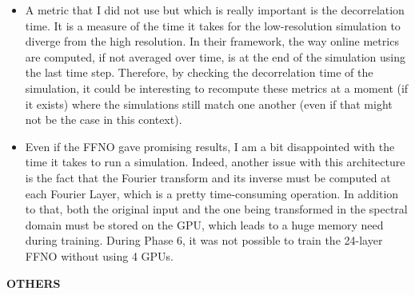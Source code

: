 \begin{itemize}
	\item A metric that I did not use but which is really important is the decorrelation time. It is a measure of the time it takes for the low-resolution simulation to diverge from the high resolution. In their framework, the way online metrics are computed, if not averaged over time, is at the end of the simulation using the last time step. Therefore, by checking the decorrelation time of the simulation, it could be interesting to recompute these metrics at a moment (if it exists) where the simulations still match one another (even if that might not be the case in this context).
	
\item Even if the FFNO gave promising results, I am a bit disappointed with the time it takes to run a simulation. Indeed, another issue with this architecture is the fact that the Fourier transform and its inverse must be computed at each Fourier Layer, which is a pretty time-consuming operation. In addition to that, both the original input and the one being transformed in the spectral domain must be stored on the GPU, which leads to a huge memory need during training. During Phase 6, it was not possible to train the 24-layer FFNO without using 4 GPUs.
	
\end{itemize}

\textbf{OTHERS}

